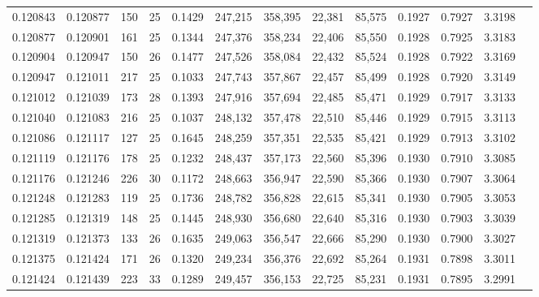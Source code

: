 \begin{tabular}{rrrrrrrrrrrrr}
0.120843 & 0.120877 & 150 &  25 &                                     0.1429 & 247,215 & 358,395 &  22,381 &  85,575 & 0.1927 & 0.7927 & 3.3198 \\
0.120877 & 0.120901 & 161 &  25 &                                     0.1344 & 247,376 & 358,234 &  22,406 &  85,550 & 0.1928 & 0.7925 & 3.3183 \\
0.120904 & 0.120947 & 150 &  26 &                                     0.1477 & 247,526 & 358,084 &  22,432 &  85,524 & 0.1928 & 0.7922 & 3.3169 \\
0.120947 & 0.121011 & 217 &  25 &                                     0.1033 & 247,743 & 357,867 &  22,457 &  85,499 & 0.1928 & 0.7920 & 3.3149 \\
0.121012 & 0.121039 & 173 &  28 &                                     0.1393 & 247,916 & 357,694 &  22,485 &  85,471 & 0.1929 & 0.7917 & 3.3133 \\
0.121040 & 0.121083 & 216 &  25 &                                     0.1037 & 248,132 & 357,478 &  22,510 &  85,446 & 0.1929 & 0.7915 & 3.3113 \\
0.121086 & 0.121117 & 127 &  25 &                                     0.1645 & 248,259 & 357,351 &  22,535 &  85,421 & 0.1929 & 0.7913 & 3.3102 \\
0.121119 & 0.121176 & 178 &  25 &                                     0.1232 & 248,437 & 357,173 &  22,560 &  85,396 & 0.1930 & 0.7910 & 3.3085 \\
0.121176 & 0.121246 & 226 &  30 &                                     0.1172 & 248,663 & 356,947 &  22,590 &  85,366 & 0.1930 & 0.7907 & 3.3064 \\
0.121248 & 0.121283 & 119 &  25 &                                     0.1736 & 248,782 & 356,828 &  22,615 &  85,341 & 0.1930 & 0.7905 & 3.3053 \\
0.121285 & 0.121319 & 148 &  25 &                                     0.1445 & 248,930 & 356,680 &  22,640 &  85,316 & 0.1930 & 0.7903 & 3.3039 \\
0.121319 & 0.121373 & 133 &  26 &                                     0.1635 & 249,063 & 356,547 &  22,666 &  85,290 & 0.1930 & 0.7900 & 3.3027 \\
0.121375 & 0.121424 & 171 &  26 &                                     0.1320 & 249,234 & 356,376 &  22,692 &  85,264 & 0.1931 & 0.7898 & 3.3011 \\
0.121424 & 0.121439 & 223 &  33 &                                     0.1289 & 249,457 & 356,153 &  22,725 &  85,231 & 0.1931 & 0.7895 & 3.2991 \\

\end{tabular}
